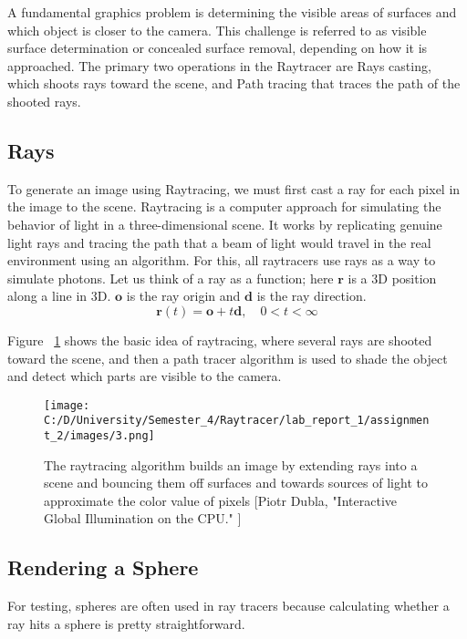 \documentclass{article}
\begin{document}
	A fundamental graphics problem is determining the visible areas of surfaces and which object is closer to the camera. This challenge is referred to as visible surface determination or concealed surface removal, depending on how it is approached. The primary two operations in the Raytracer are Rays casting, which shoots rays toward the scene, and Path tracing that traces the path of the shooted rays.
	
	\subsection{Rays}
	To generate an image using Raytracing, we must first cast a ray for each pixel in the image to the scene.
	Raytracing is a computer approach for simulating the behavior of light in a three-dimensional scene. It works by replicating genuine light rays and tracing the path that a beam of light would travel in the real environment using an algorithm. 
	For this, all raytracers use rays as a way to simulate photons. Let us think of a ray as a function; here $\pmb{r} $ is a 3D position along a line in 3D. $\pmb{o} $ is the ray origin and $\pmb{d} $ is the ray direction.
	\begin{equation}
		\pmb{r} (t) = \pmb{o} + t\pmb{d} ,  \quad  0 < t < \infty
	\end{equation}
	
	Figure ~\ref{fig:1} shows the basic idea of raytracing, where several rays are shooted toward the scene, and then a path tracer algorithm is used to shade the object and detect which parts are visible to the camera.
	\begin{figure}[H]
		\begin{center}
			\texttt{[image: C:/D/University/Semester\_4/Raytracer/lab\_report\_1/assignment\_2/images/3.png]}
			
			\caption{The raytracing algorithm builds an image by extending rays into a scene and bouncing them off surfaces and towards sources of light to approximate the color value of pixels [Piotr Dubla, "Interactive Global Illumination on the CPU."
				]}
			\label{fig:1}
		\end{center}
	\end{figure}
	
	\subsection{Rendering a Sphere}
	For testing, spheres are often used in ray tracers because
	calculating whether a ray hits a sphere is pretty straightforward.
	
\end{document}
